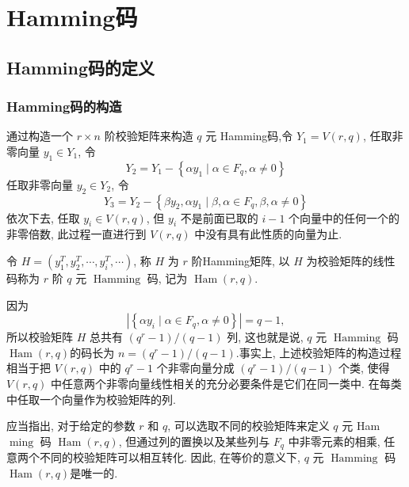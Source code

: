 \chapter{Hamming码}

\section{Hamming码的定义}

\subsection{ Hamming码的构造}

通过构造一个 $ r \times n $ 阶校验矩阵来构造 $ q $ 元 Hamming码,令 $ Y_{1}=V(r, q) $, 任取非零向量 $ y_{1} \in Y_{1} $, 令
$$
Y_{2}=Y_{1}-\left\{\alpha y_{1} \mid \alpha \in F_{q}, \alpha \neq 0\right\}
$$
任取非零向量 $ y_{2} \in Y_{2} $, 令 
$$
 Y_{3}=Y_{2}-\left\{\beta y_{2}, \alpha y_{1} \mid \beta, \alpha \in F_{q}, \beta, \alpha \neq 0\right\}
$$
依次下去, 任取 $ y_{i} \in V(r, q) $, 但 $ y_{i} $ 不是前面已取的 $ i-1 $ 个向量中的任何一个的非零倍数, 此过程一直进行到 $ V(r, q) $ 中没有具有此性质的向量为止.

令 $ H=\left(y_{1}^{T}, y_{2}^{T}, \cdots, y_{i}^{T}, \cdots\right) $, 称 $ H $ 为 $ r $ 阶Hamming矩阵, 以 $ H $ 为校验矩阵的线性码称为 $ r $ 阶 $ q $ 元 $ \operatorname{Hamming} $ 码, 记为 $ \operatorname{Ham}(r, q) $.

因为
$$
\left|\left\{\alpha y_{i} \mid \alpha \in F_{q}, \alpha \neq 0\right\}\right|=q-1,
$$
所以校验矩阵 $ H $ 总共有 $ \left(q^{r}-1\right) /(q-1) $ 列, 这也就是说, $ q $ 元 $ \operatorname{Hamming} $ 码 $ \operatorname{Ham}(r, q) $的码长为 $ n=\left(q^{r}-1\right) /(q-1) $.事实上, 上述校验矩阵的构造过程相当于把 $ V(r, q) $ 中的 $ q^{r}-1 $ 个非零向量分成 $ \left(q^{r}-1\right) /(q-1) $ 个类, 使得 $ V(r, q) $ 中任意两个非零向量线性相关的充分必要条件是它们在同一类中. 在每类中任取一个向量作为校验矩阵的列.

应当指出, 对于给定的参数 $ r $ 和 $ q $, 可以选取不同的校验矩阵来定义 $ q $ 元 Ham$ \operatorname{ming} $ 码 $ \operatorname{Ham}(r, q) $, 但通过列的置换以及某些列与 $ F_{q} $ 中非零元素的相乘, 任意两个不同的校验矩阵可以相互转化. 因此, 在等价的意义下, $ q $ 元 $ \operatorname{Hamming} $ 码 $ \operatorname{Ham}(r, q) $是唯一的.

